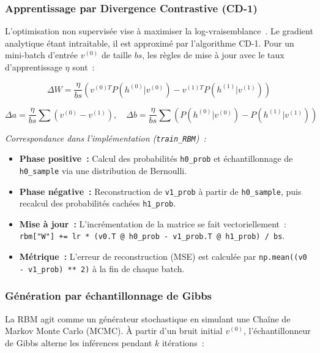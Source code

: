 \documentclass[11pt,a4paper]{article}
\renewcommand{\texttt}[1]{\urlstyle{tt}\nolinkurl{#1}}
\begin{document}
\subsubsection{Apprentissage par Divergence Contrastive (CD-1)}

L'optimisation non supervis\'ee vise \`a maximiser la log-vraisemblance~\cite{hinton2002}. Le gradient analytique \'etant intraitable, il est approxim\'e par l'algorithme CD-1. Pour un mini-batch d'entr\'ee $v^{(0)}$ de taille $bs$, les r\`egles de mise \`a jour avec le taux d'apprentissage $\eta$ sont~:

\begin{equation}
\Delta W = \frac{\eta}{bs}\left(v^{(0)T} P(h^{(0)}|v^{(0)}) - v^{(1)T} P(h^{(1)}|v^{(1)})\right)
\label{eq:cd1_w}
\end{equation}

\begin{equation}
\Delta a = \frac{\eta}{bs}\sum\left(v^{(0)} - v^{(1)}\right), \quad \Delta b = \frac{\eta}{bs}\sum\left(P(h^{(0)}|v^{(0)}) - P(h^{(1)}|v^{(1)})\right)
\label{eq:cd1_ab}
\end{equation}

\noindent\textit{Correspondance dans l'impl\'ementation (\texttt{train\_RBM})~:}
\begin{itemize}
    \item \textbf{Phase positive~:} Calcul des probabilit\'es \texttt{h0\_prob} et \'echantillonnage de \texttt{h0\_sample} via une distribution de Bernoulli.
    \item \textbf{Phase n\'egative~:} Reconstruction de \texttt{v1\_prob} \`a partir de \texttt{h0\_sample}, puis recalcul des probabilit\'es cach\'ees \texttt{h1\_prob}.
    \item \textbf{Mise \`a jour~:} L'incr\'ementation de la matrice se fait vectoriellement~: \texttt{rbm["W"] += lr * (v0.T @ h0\_prob - v1\_prob.T @ h1\_prob) / bs}.
    \item \textbf{M\'etrique~:} L'erreur de reconstruction (MSE) est calcul\'ee par \texttt{np.mean((v0 - v1\_prob) ** 2)} \`a la fin de chaque batch.
\end{itemize}

\subsubsection{G\'en\'eration par \'echantillonnage de Gibbs}

La RBM agit comme un g\'en\'erateur stochastique en simulant une Cha\^ine de Markov Monte Carlo (MCMC). \`A partir d'un bruit initial $v^{(0)}$, l'\'echantillonneur de Gibbs alterne les inf\'erences pendant $k$ it\'erations~:
\end{document}
